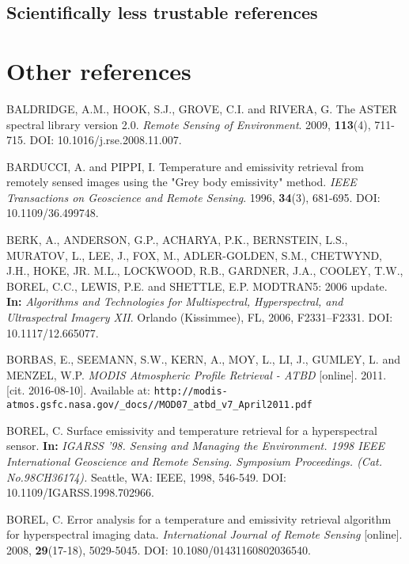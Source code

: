 \begin{thebibliography}{10}
\subsection*{Scientifically less trustable references}


\section*{Other references}


 BALDRIDGE, A.M., HOOK, S.J., GROVE, C.I. and RIVERA, G. The ASTER spectral library version 2.0. \textit{Remote Sensing of Environment}. 2009, \textbf{113}(4), 711-715. DOI: 10.1016/j.rse.2008.11.007.

 BARDUCCI, A. and PIPPI, I. Temperature and emissivity retrieval from remotely sensed images using the "Grey body emissivity" method. \textit{IEEE Transactions on Geoscience and Remote Sensing}. 1996, \textbf{34}(3), 681-695. DOI: 10.1109/36.499748.

 BERK, A., ANDERSON, G.P., ACHARYA, P.K., BERNSTEIN, L.S., MURATOV, L., LEE, J., FOX, M., ADLER-GOLDEN, S.M., CHETWYND, J.H., HOKE, JR. M.L., LOCKWOOD, R.B., GARDNER, J.A., COOLEY, T.W., BOREL, C.C., LEWIS, P.E. and SHETTLE, E.P. MODTRAN5: 2006 update. \textbf{In:} \textit{Algorithms and Technologies for Multispectral, Hyperspectral, and Ultraspectral Imagery XII}. Orlando (Kissimmee), FL, 2006, F2331--F2331. DOI: 10.1117/12.665077.

 BORBAS, E., SEEMANN, S.W., KERN, A., MOY, L., LI, J., GUMLEY, L. and MENZEL, W.P. \textit{MODIS Atmospheric Profile Retrieval - ATBD} [online]. 2011. [cit. 2016-08-10]. Available at: \verb|http://modis-atmos.gsfc.nasa.gov/_docs//MOD07_atbd_v7_April2011.pdf|

 BOREL, C. Surface emissivity and temperature retrieval for a hyperspectral sensor. \textbf{In:} \textit{IGARSS '98. Sensing and Managing the Environment. 1998 IEEE International Geoscience and Remote Sensing. Symposium Proceedings. (Cat. No.98CH36174).} Seattle, WA: IEEE, 1998, 546-549. DOI: 10.1109/IGARSS.1998.702966.

 BOREL, C. Error analysis for a temperature and emissivity retrieval algorithm for hyperspectral imaging data. \textit{International Journal of Remote Sensing} [online]. 2008, \textbf{29}(17-18), 5029-5045. DOI: 10.1080/01431160802036540.


\end{thebibliography}
